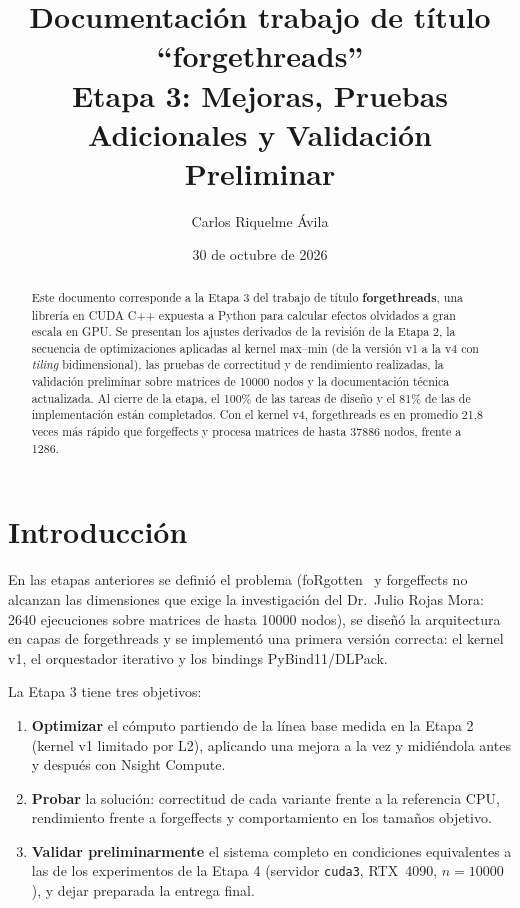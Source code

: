 \documentclass[11pt,a4paper]{article}
\title{Documentación trabajo de título ``forgethreads''\\[2pt]
\large Etapa 3: Mejoras, Pruebas Adicionales y Validación Preliminar}
\author{Carlos Riquelme Ávila}
\date{30 de octubre de 2026}
\begin{document}
\maketitle

\begin{abstract}
Este documento corresponde a la Etapa 3 del trabajo de título \textbf{forgethreads}, una
librería en CUDA C++ expuesta a Python para calcular efectos olvidados a gran escala en GPU.
Se presentan los ajustes derivados de la revisión de la Etapa 2, la secuencia de
optimizaciones aplicadas al kernel max--min (de la versión v1 a la v4 con \emph{tiling}
bidimensional), las pruebas de correctitud y de rendimiento realizadas, la validación
preliminar sobre matrices de \num{10000} nodos y la documentación técnica actualizada.
Al cierre de la etapa, el 100\% de las tareas de diseño y el 81\% de las de
implementación están completados. Con el kernel v4, forgethreads es en promedio 21,8 veces más
rápido que forgeffects y procesa matrices de hasta \num{37886} nodos, frente a \num{1286}.
\end{abstract}

\section{Introducción}
En las etapas anteriores se definió el problema (foRgotten~\cite{forgotten} y forgeffects no
alcanzan las dimensiones que exige la investigación del Dr.\ Julio Rojas Mora: \num{2640}
ejecuciones sobre matrices de hasta \num{10000} nodos), se diseñó la arquitectura en capas de
forgethreads y se implementó una primera versión correcta: el kernel v1, el orquestador
iterativo y los bindings PyBind11/DLPack.

La Etapa 3 tiene tres objetivos:
\begin{enumerate}
  \item \textbf{Optimizar} el cómputo partiendo de la línea base medida en la Etapa 2
        (kernel v1 limitado por L2), aplicando una mejora a la vez y midiéndola antes y
        después con Nsight Compute.
  \item \textbf{Probar} la solución: correctitud de cada variante frente a la referencia CPU,
        rendimiento frente a forgeffects y comportamiento en los tamaños objetivo.
  \item \textbf{Validar preliminarmente} el sistema completo en condiciones equivalentes a las
        de los experimentos de la Etapa 4 (servidor \texttt{cuda3}, RTX~4090, $n=\num{10000}$),
        y dejar preparada la entrega final.
\end{enumerate}
\end{document}
